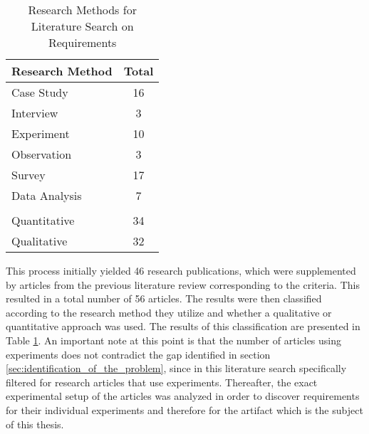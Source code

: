 \begin{table}[htbp]
    \centering
    \small
    \begin{tabular}{ll}
    \hline
    \multicolumn{1}{l}{Research Method} & \multicolumn{1}{l}{Total} \\ \hline
    \multicolumn{1}{l}{Case  Study}     & \multicolumn{1}{c}{16}    \\ 
    \multicolumn{1}{l}{Interview}       & \multicolumn{1}{c}{3}     \\ 
    \multicolumn{1}{l}{Experiment}      & \multicolumn{1}{c}{10}    \\ 
    \multicolumn{1}{l}{Observation}     & \multicolumn{1}{c}{3}     \\ 
    \multicolumn{1}{l}{Survey}          & \multicolumn{1}{c}{17}    \\ 
    \multicolumn{1}{l}{Data Analysis}   & \multicolumn{1}{c}{7}     \\ 
                                            &                            \\ \hline
    \multicolumn{1}{l}{Quantitative}    & \multicolumn{1}{c}{34}    \\ 
    \multicolumn{1}{l}{Qualitative}     & \multicolumn{1}{c}{32}    \\ \hline
    \end{tabular}
    \caption[Research Methods for Literature Search on Requirements]{Research Methods for Literature Search on Requirements}\label{tab:secondLiteratureSearch}
    \end{table}

This process initially yielded 46 research publications, which were supplemented by articles from the previous literature review corresponding to the criteria. This resulted in a total number of 56 articles. The results were then classified according to the research method they utilize and whether a qualitative or quantitative approach was used. The results of this classification are presented in Table \ref{tab:secondLiteratureSearch}. An important note at this point is that the number of articles using experiments does not contradict the gap identified in section \ref{sec:identification_of_the_problem}, since in this literature search specifically filtered for research articles that use experiments. Thereafter, the exact experimental setup of the articles was analyzed in order to discover requirements for their individual experiments and therefore for the artifact which is the subject of this thesis.




